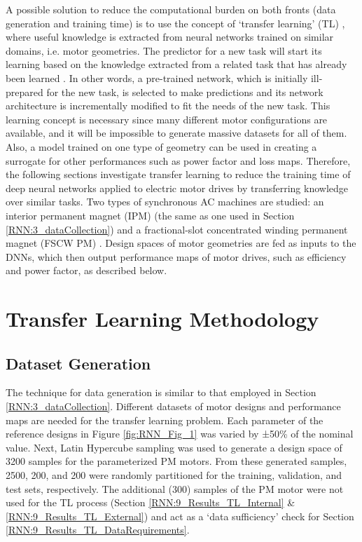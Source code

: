 A possible solution to reduce the computational burden on both fronts (data generation and training time) is to use the concept of ‘transfer learning’ (TL) \parencite{pan2009survey}, where useful knowledge is extracted from neural networks trained on similar domains, i.e. motor geometries. The predictor for a new task will start its learning based on the knowledge extracted from a related task that has already been learned \parencite{mou2016transferable}. In other words, a pre-trained network, which is initially ill-prepared for the new task, is selected to make predictions and its network architecture is incrementally modified to fit the needs of the new task. This learning concept is necessary since many different motor configurations are available, and it will be impossible to generate massive datasets for all of them. Also, a model trained on one type of geometry can be used in creating a surrogate for other performances such as power factor and loss maps. Therefore, the following sections investigate transfer learning to reduce the training time of deep neural networks applied to electric motor drives by transferring knowledge over similar tasks. Two types of synchronous AC machines are studied: an interior permanent magnet (IPM) \parencite{khan2019deep} (the same as one used in Section \ref{RNN:3_dataCollection}) and a fractional-slot concentrated winding permanent magnet (FSCW PM) \parencite{reddy2012comparison, rahman2017comparison}. Design spaces of motor geometries are fed as inputs to the DNNs, which then output performance maps of motor drives, such as efficiency and power factor, as described below.

\section{Transfer Learning Methodology}\label{RNN:7_TL_methodology}

\subsection{Dataset Generation}

The technique for data generation is similar to that employed in Section \ref{RNN:3_dataCollection}. Different datasets of motor designs and performance maps are needed for the transfer learning problem. Each parameter of the reference designs in Figure \ref{fig:RNN_Fig_1} was varied by ±50\% of the nominal value. Next, Latin Hypercube sampling was used to generate a design space of 3200 samples for the parameterized PM motors. From these generated samples, 2500, 200, and 200 were randomly partitioned for the training, validation, and test sets, respectively. The additional (300) samples of the PM motor were not used for the TL process (Section \ref{RNN:9_Results_TL_Internal} \& \ref{RNN:9_Results_TL_External}) and act as a ‘data sufficiency’ check for Section \ref{RNN:9_Results_TL_DataRequirements}.

